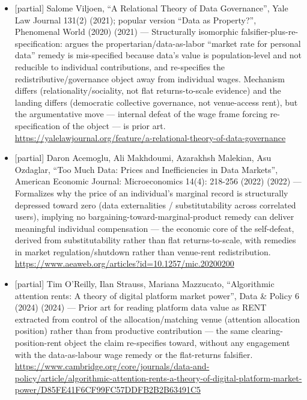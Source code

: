 \documentclass[
  11pt,
]{article}
\begin{document}
\begin{itemize}
  the object as rent. Companion CDC paper (CSCW 2021,
  dl.acm.org/doi/10.1145/3449177) quantifies the same
  diminishing-returns constraint.
  \url{https://dl.acm.org/doi/10.1145/3308558.3313742}
\item
  {[}partial{]} Salome Viljoen, ``A Relational Theory of Data
  Governance'', Yale Law Journal 131(2) (2021); popular version ``Data
  as Property?'', Phenomenal World (2020) (2021) --- Structurally
  isomorphic falsifier-plus-re-specification: argues the
  propertarian/data-as-labor ``market rate for personal data'' remedy is
  mis-specified because data's value is population-level and not
  reducible to individual contributions, and re-specifies the
  redistributive/governance object away from individual wages. Mechanism
  differs (relationality/sociality, not flat returns-to-scale evidence)
  and the landing differs (democratic collective governance, not
  venue-access rent), but the argumentative move --- internal defeat of
  the wage frame forcing re-specification of the object --- is prior
  art.
  \url{https://yalelawjournal.org/feature/a-relational-theory-of-data-governance}
\item
  {[}partial{]} Daron Acemoglu, Ali Makhdoumi, Azarakhsh Malekian, Asu
  Ozdaglar, ``Too Much Data: Prices and Inefficiencies in Data
  Markets'', American Economic Journal: Microeconomics 14(4): 218-256
  (2022) (2022) --- Formalizes why the price of an individual's marginal
  record is structurally depressed toward zero (data externalities /
  substitutability across correlated users), implying no
  bargaining-toward-marginal-product remedy can deliver meaningful
  individual compensation --- the economic core of the self-defeat,
  derived from substitutability rather than flat returns-to-scale, with
  remedies in market regulation/shutdown rather than venue-rent
  redistribution.
  \url{https://www.aeaweb.org/articles?id=10.1257/mic.20200200}
\item
  {[}partial{]} Tim O'Reilly, Ilan Strauss, Mariana Mazzucato,
  ``Algorithmic attention rents: A theory of digital platform market
  power'', Data \& Policy 6 (2024) (2024) --- Prior art for reading
  platform data value as RENT extracted from control of the
  allocation/matching venue (attention allocation position) rather than
  from productive contribution --- the same clearing-position-rent
  object the claim re-specifies toward, without any engagement with the
  data-as-labour wage remedy or the flat-returns falsifier.
  \url{https://www.cambridge.org/core/journals/data-and-policy/article/algorithmic-attention-rents-a-theory-of-digital-platform-market-power/D85FE41F6CF99FC57DDFB2B2B63491C5}
\end{itemize}
\end{document}
